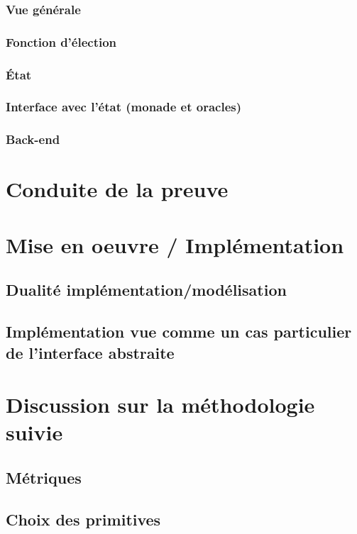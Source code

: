 			\subsubsection{Vue générale}
			\subsubsection{Fonction d'élection}
			\subsubsection{État}
			\subsubsection{Interface avec l'état (monade et oracles)}
			\subsubsection{Back-end}

		
	\section{Conduite de la preuve}

	\section{Mise en oeuvre / Implémentation}
		\subsection{Dualité implémentation/modélisation}
		
		\subsection{Implémentation vue comme un cas particulier de l'interface abstraite}

	\section{Discussion sur la méthodologie suivie}
		\subsection{Métriques}
		\subsection{Choix des primitives}
